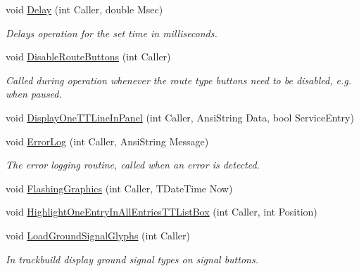 \begin{DoxyCompactItemize}
void \mbox{\hyperlink{class_t_interface_a7fa894f52a3cb9746e81166ec1a81bf3}{Delay}} (int Caller, double Msec)
\begin{DoxyCompactList}\small\item\em Delays operation for the set time in milliseconds. \end{DoxyCompactList}\item 
\mbox{\label{class_t_interface_ac0c9be911e93134ddda04ba498a8bd9c}} 
void \mbox{\hyperlink{class_t_interface_ac0c9be911e93134ddda04ba498a8bd9c}{Disable\+Route\+Buttons}} (int Caller)
\begin{DoxyCompactList}\small\item\em Called during operation whenever the route type buttons need to be disabled, e.\+g. when paused. \end{DoxyCompactList}\item 
void \mbox{\hyperlink{class_t_interface_a1181c865da8cea56e6f0af6b31a88db0}{Display\+One\+T\+T\+Line\+In\+Panel}} (int Caller, Ansi\+String Data, bool Service\+Entry)
\item 
\mbox{\label{class_t_interface_a4f3a25665e2266441217849f947a1adf}} 
void \mbox{\hyperlink{class_t_interface_a4f3a25665e2266441217849f947a1adf}{Error\+Log}} (int Caller, Ansi\+String Message)
\begin{DoxyCompactList}\small\item\em The error logging routine, called when an error is detected. \end{DoxyCompactList}\item 
void \mbox{\hyperlink{class_t_interface_a7e6535742855a19cb3e35b1711a7ab59}{Flashing\+Graphics}} (int Caller, T\+Date\+Time Now)
\item 
void \mbox{\hyperlink{class_t_interface_a273468a729b5b2ba5dd599c5ae1a1c19}{Highlight\+One\+Entry\+In\+All\+Entries\+T\+T\+List\+Box}} (int Caller, int Position)
\item 
\mbox{\label{class_t_interface_a3f17b5281842894e9cd477b4351a6c9f}} 
void \mbox{\hyperlink{class_t_interface_a3f17b5281842894e9cd477b4351a6c9f}{Load\+Ground\+Signal\+Glyphs}} (int Caller)
\begin{DoxyCompactList}\small\item\em In trackbuild display ground signal types on signal buttons. \end{DoxyCompactList}\item 

\end{DoxyCompactItemize}
